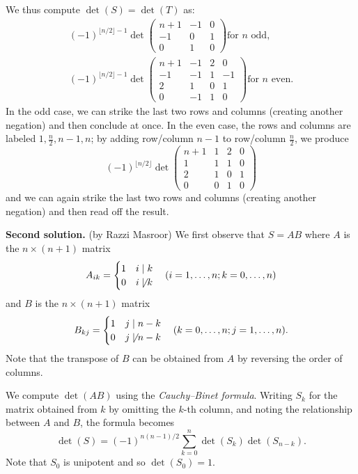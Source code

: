 \documentclass[amssymb,twocolumn,pra,10pt,aps]{revtex4-1}
\begin{document}
\begin{itemize}
We thus compute $\det(S) = \det(T)$ as:
\begin{gather*}
(-1)^{\lfloor n/2 \rfloor-1}
\det \begin{pmatrix}
n+1 & -1 & 0 \\
-1 & 0 & 1 \\
0 & 1  & 0
\end{pmatrix} \mbox{for $n$ odd,} \\
(-1)^{\lfloor n/2 \rfloor-1}
 \det \begin{pmatrix}
n+1 & -1 & 2 & 0 \\
-1 & -1 & 1 & -1 \\
2 & 1 & 0 & 1 \\
0 & -1 & 1 & 0
\end{pmatrix} \mbox{for $n$ even.}
\end{gather*}
In the odd case, we can strike the last two rows and columns (creating another negation) and then conclude at once. In the even case, the rows and columns are labeled $1, \frac{n}{2}, n-1, n$; by adding row/column $n-1$ to row/column $\frac{n}{2}$, we produce
\[
(-1)^{\lfloor n/2 \rfloor}
 \det \begin{pmatrix}
n+1 & 1 & 2 & 0 \\
1 & 1 & 1 & 0 \\
2 & 1 & 0 & 1 \\
0 & 0 & 1 & 0
\end{pmatrix}
\]
and we can again strike the last two rows and columns (creating another negation) and then read off the result.

\noindent
\textbf{Second solution.} (by Razzi Masroor)
We first observe that $S = AB$ where  $A$ is the $n \times (n+1)$ matrix
\[
A_{ik} = \begin{cases} 1 & i \mid k \\ 0 & i \not\mid k \end{cases}
\quad (i=1,\dots,n; k=0,\dots,n)
\]
and $B$ is the $n \times (n+1)$ matrix
\[
B_{kj} = \begin{cases} 1 & j \mid n-k \\ 0 & j \not\mid n-k \end{cases}
\quad (k=0,\dots,n; j=1,\dots,n).
\]
Note that the transpose of $B$ can be obtained from $A$ by reversing the order of columns.

We compute $\det(AB)$ using the \emph{Cauchy--Binet formula}. Writing $S_k$ for the matrix obtained from $k$ by omitting the $k$-th column, and noting the relationship between $A$ and $B$, the formula becomes
\[
\det(S) = (-1)^{n(n-1)/2} \sum_{k=0}^n \det (S_k) \det(S_{n-k}).
\]
Note that $S_0$ is unipotent and so $\det(S_0) = 1$.


\end{itemize}
\end{document}
